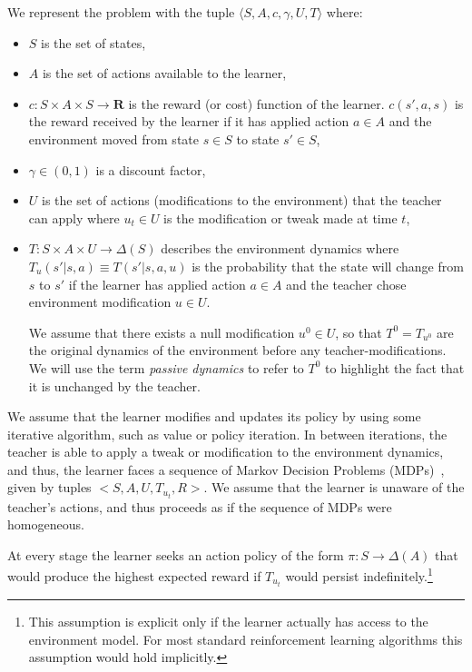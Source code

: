 We represent  the problem with the tuple  $\langle S, A, c,\gamma, U,T\rangle$ where:
\begin{itemize}
\item $S$ is the set of states, 
\item $A$ is the set of actions available to the learner,
\item  $c:S\times A\times S\rightarrow\mathbf{R}$ is the reward (or
  cost) function of the learner. $c(s',a,s)$ is the reward received by
  the learner if it has applied action $a\in A$ and the environment
  moved from state $s\in S$ to state $s'\in S$,
\item $\gamma \in (0,1)$ is a discount factor,   

\item $U$ is the set of actions (modifications to the environment)
  that the teacher can apply where $u_t\in U$ is the modification or tweak made
  at time $t$,

\item $T:S\times A\times U\rightarrow\Delta(S)$ describes the
  environment dynamics where $T_u(s'|s,a)\equiv T(s'|s,a,u)$ is the
  probability that the state will change from $s$ to $s'$ if the
  learner has applied action $a\in A$ and the teacher chose
  environment modification $u\in U$.

We assume that there exists a null modification $u^0\in U$, so that
$T^0=T_{u^0}$ are the original dynamics of the environment before any
teacher-modifications. We will use the term \emph{passive dynamics} to
refer to $T^0$ to highlight the fact that it is unchanged by the teacher.

\end{itemize}

We assume that the learner modifies and updates its policy by using
some iterative algorithm, such as value or policy iteration.  In
between iterations, the teacher is able to apply a tweak or
modification to the environment dynamics, and thus, the learner faces
a sequence of Markov Decision Problems (MDPs)~\cite{puterman_book_94},
given by tuples $<S,A,U,T_{u_t},R>$. We assume that the learner is
unaware of the teacher's actions, and thus proceeds as if the sequence
of MDPs were homogeneous.
 
 
\begin{assume}\label{assume_persistence}
At every stage the learner seeks an action policy of the form
$\pi:S\rightarrow\Delta(A)$ that would produce the highest expected
reward if $T_{u_t}$ would persist indefinitely.\footnote{This
  assumption is explicit only if the learner actually has access to
  the environment model. For most standard reinforcement learning
  algorithms this assumption would hold implicitly.}
\end{assume}


